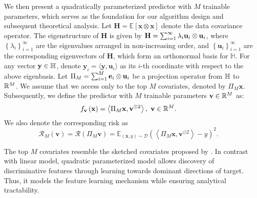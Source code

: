 We then present a quadratically parameterized predictor with $M$ trainable parameters, which serves as the foundation for our algorithm design and subsequent theoretical analysis. Let $\mathbf{H}=\mathbb{E}[\mathbf{x}\otimes \mathbf{x}] $ denote the data covariance operator. The eigenstructure of $\mathbf{H}$ is given by  $\mathbf{H}=\sum_{i=1}^{\infty}\lambda_i\mathbf{u}_i\otimes \mathbf{u}_i$, where $\left \{ \lambda_i \right \} _{i=1}^{\infty }$ are the eigenvalues arranged in non-increasing order, and $\left \{ \mathbf{u}_i \right \} _{i=1}^{\infty }$ are the corresponding eigenvectors of $\mathbf{H}$, which form an orthonormal basis for $\mathbb{H}$. For any vector $\mathbf{y}\in \mathbb{H}$, denote $\mathbf{y}_i=\langle\mathbf{y},\mathbf{u}_i\rangle$ as its $i$-th coordinate with respect to the above eigenbasis.
Let $\Pi_M =\sum_{i=1}^M\mathbf{e}_i\otimes\mathbf{u}_i$ be a projection operator from $\mathbb{H}$ to $\mathbb{R}^M$.
We assume that we access only to the top $M$ covariates, denoted by $\Pi_M \mathbf{x} $. Subsequently, we define the predictor with $M$ trainable parameters $\mathbf{v}\in \mathbb{R}^M$ as: 
\begin{equation}\nonumber
    f_{\mathbf{v} }\left (  \mathbf{x} \right ) = \left \langle \Pi_M \mathbf{x}, \mathbf{v}^{\odot 2}   \right \rangle ,\ \mathbf{v}\in \mathbb{R}^M.
\end{equation}
We also denote the corresponding risk as 
\begin{equation}\label{RM}
    \mathcal{R}_{M}\left ( \mathbf{v}  \right )=\mathcal{R}\left ( \Pi _M\mathbf{v}  \right )=\mathbb{E}_{\left ( \mathbf{x},y  \right ) \sim \mathcal{D} }\left ( \left \langle \Pi_M \mathbf{x}, \mathbf{v}^{\odot 2} \right \rangle -y \right ) ^2. 
\end{equation}

The top $M$ covariates resemble the sketched covariates proposed by \citet{lin2024scaling}. In contrast with linear model, quadratic parameterized model allows discovery of discriminative features through learning towards dominant directions of target. Thus, it models the feature learning mechanism  while ensuring analytical tractability.



